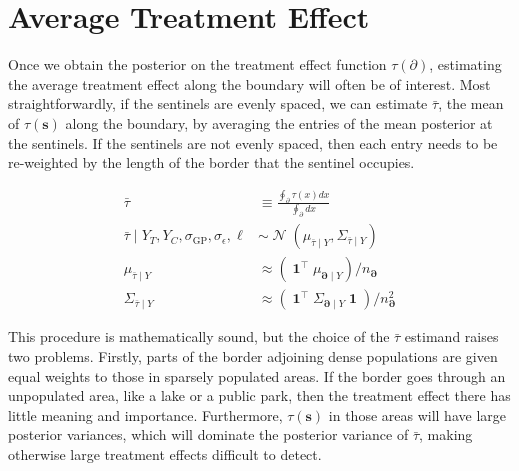 \documentclass[letter]{article}
\newcommand{\genericdel}[3]{%
      \left#1#3\right#2
    }
\newcommand{\del}[1]{\genericdel(){#1}}
\DeclareMathOperator{\normal}{\mathcal{N}}
\DeclareMathOperator{\ones}{\mathbf{1}}
\newcommand{\trans}{^{\intercal}}
\newcommand{\sigmaf}{\sigma_{\mathrm{GP}}}
\newcommand{\sigman}{\sigma_{\epsilon}}
\newcommand{\svec}{\mathbold{s}}
\newcommand{\boundary}{\partial}
\newcommand{\sentinels}{\bm{\boundary}}
\newcommand{\linavg}{\bar{\tau}}
\begin{document}
    	\section{Average Treatment Effect}\label{average-treatment-effect}

Once we obtain the posterior on the treatment effect function
\(\tau(\boundary)\), estimating the average treatment effect along the
boundary will often be of interest. Most straightforwardly, if the
sentinels are evenly spaced, we can estimate \(\linavg\), the mean of
\(\tau(\svec)\) along the boundary, by averaging the entries of the mean
posterior at the sentinels. If the sentinels are not evenly spaced, then
each entry needs to be re-weighted by the length of the border that the
sentinel occupies.

\begin{equation}\begin{split}
    \linavg &\equiv \frac{\oint_\boundary \left. \tau(x) dx \right.}{\oint_\boundary \left. dx \right.} \\
    \linavg \mid Y_T, Y_C, \sigmaf, \sigman, \ell &\sim \normal\del{\mu_{\linavg \mid Y}, \Sigma_{\linavg \mid Y}} \\
    \mu_{\linavg \mid Y} &\approx \del{\ones\trans \mu_{\sentinels \mid Y}} / n_{\sentinels} \\
    \Sigma_{\linavg \mid Y} &\approx \del{\ones\trans \Sigma_{\sentinels \mid Y} \ones} / n_{\sentinels}^2
\end{split}\end{equation}

This procedure is mathematically sound, but the choice of the
\(\linavg\) estimand raises two problems. Firstly, parts of the border
adjoining dense populations are given equal weights to those in sparsely
populated areas. If the border goes through an unpopulated area, like a
lake or a public park, then the treatment effect there has little
meaning and importance. Furthermore, \(\tau(\svec)\) in those areas will
have large posterior variances, which will dominate the posterior
variance of \(\linavg\), making otherwise large treatment effects
difficult to detect.
\end{document}
